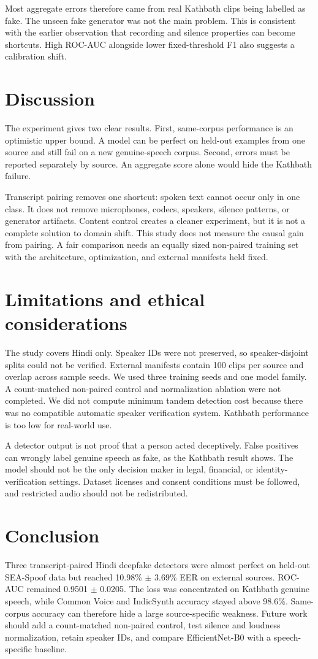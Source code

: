 \documentclass[3p,times,procedia]{elsarticle}
\begin{document}
Most aggregate errors therefore came from real Kathbath clips being labelled
as fake. The unseen fake generator was not the main problem. This is
consistent with the earlier observation that recording and silence
properties can become shortcuts. High ROC-AUC alongside lower
fixed-threshold F1 also suggests a calibration shift.

\section{Discussion}
The experiment gives two clear results. First, same-corpus performance is an
optimistic upper bound. A model can be perfect on held-out examples from one
source and still fail on a new genuine-speech corpus. Second, errors must be
reported separately by source. An aggregate score alone would hide the
Kathbath failure.

Transcript pairing removes one shortcut: spoken text cannot occur only in
one class. It does not remove microphones, codecs, speakers, silence
patterns, or generator artifacts. Content control creates a cleaner
experiment, but it is not a complete solution to domain shift. This study
does not measure the causal gain from pairing. A fair comparison needs an
equally sized non-paired training set with the architecture, optimization,
and external manifests held fixed.

\section{Limitations and ethical considerations}
The study covers Hindi only. Speaker IDs were not preserved, so
speaker-disjoint splits could not be verified. External manifests contain
100 clips per source and overlap across sample seeds. We used three training
seeds and one model family. A count-matched non-paired control and
normalization ablation were not completed. We did not compute minimum tandem
detection cost because there was no compatible automatic speaker
verification system. Kathbath performance is too low for real-world use.

A detector output is not proof that a person acted deceptively. False
positives can wrongly label genuine speech as fake, as the Kathbath result
shows. The model should not be the only decision maker in legal, financial,
or identity-verification settings. Dataset licenses and consent conditions
must be followed, and restricted audio should not be redistributed.

\section{Conclusion}
Three transcript-paired Hindi deepfake detectors were almost perfect on
held-out SEA-Spoof data but reached 10.98\% $\pm$ 3.69\% EER on external
sources. ROC-AUC remained 0.9501 $\pm$ 0.0205. The loss was concentrated on
Kathbath genuine speech, while Common Voice and IndicSynth accuracy stayed
above 98.6\%. Same-corpus accuracy can therefore hide a large source-specific
weakness. Future work should add a count-matched non-paired control, test
silence and loudness normalization, retain speaker IDs, and compare
EfficientNet-B0 with a speech-specific baseline.
\end{document}
